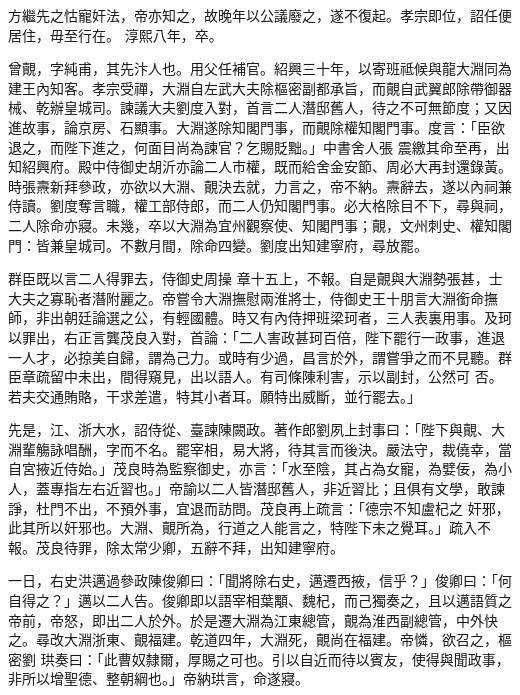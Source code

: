 \begin{pinyinscope}
 方繼先之怙寵奸法，帝亦知之，故晚年以公議廢之，遂不復起。孝宗即位，詔任便居住，毋至行在。
 淳熙八年，卒。



 曾覿，字純甫，其先汴人也。用父任補官。紹興三十年，以寄班祗候與龍大淵同為建王內知客。孝宗受禪，大淵自左武大夫除樞密副都承旨，而覿自武翼郎除帶御器械、乾辦皇城司。諫議大夫劉度入對，首言二人潛邸舊人，待之不可無節度；又因進故事，論京房、石顯事。大淵遂除知閣門事，而覿除權知閣門事。度言：「臣欲退之，而陛下進之，何面目尚為諫官？乞賜貶黜。」中書舍人張
 震繳其命至再，出知紹興府。殿中侍御史胡沂亦論二人市權，既而給舍金安節、周必大再封還錄黃。時張燾新拜參政，亦欲以大淵、覿決去就，力言之，帝不納。燾辭去，遂以內祠兼侍讀。劉度奪言職，權工部侍郎，而二人仍知閣門事。必大格除目不下，尋與祠，二人除命亦寢。未幾，卒以大淵為宜州觀察使、知閣門事；覿，文州刺史、權知閣門：皆兼皇城司。不數月間，除命四變。劉度出知建寧府，尋放罷。



 群臣既以言二人得罪去，侍御史周操
 章十五上，不報。自是覿與大淵勢張甚，士大夫之寡恥者潛附麗之。帝嘗令大淵撫慰兩淮將士，侍御史王十朋言大淵銜命撫師，非出朝廷論選之公，有輕國體。時又有內侍押班梁珂者，三人表裏用事。及珂以罪出，右正言龔茂良入對，首論：「二人害政甚珂百倍，陛下罷行一政事，進退一人才，必掠美自歸，謂為己力。或時有少過，昌言於外，謂嘗爭之而不見聽。群臣章疏留中未出，間得窺見，出以語人。有司條陳利害，示以副封，公然可
 否。若夫交通賄賂，干求差遣，特其小者耳。願特出威斷，並行罷去。」



 先是，江、浙大水，詔侍從、臺諫陳闕政。著作郎劉夙上封事曰：「陛下與覿、大淵輩觴詠唱酬，字而不名。罷宰相，易大將，待其言而後決。嚴法守，裁僥幸，當自宮掖近侍始。」茂良時為監察御史，亦言：「水至陰，其占為女寵，為嬖佞，為小人，蓋專指左右近習也。」帝諭以二人皆潛邸舊人，非近習比；且俱有文學，敢諫諍，杜門不出，不預外事，宜退而訪問。茂良再上疏言：「德宗不知盧杞之
 奸邪，此其所以奸邪也。大淵、覿所為，行道之人能言之，特陛下未之覺耳。」疏入不報。茂良待罪，除太常少卿，五辭不拜，出知建寧府。



 一日，右史洪邁過參政陳俊卿曰：「聞將除右史，邁遷西掖，信乎？」俊卿曰：「何自得之？」邁以二人告。俊卿即以語宰相葉顒、魏杞，而己獨奏之，且以邁語質之帝前，帝怒，即出二人於外。於是遷大淵為江東總管，覿為淮西副總管，中外快之。尋改大淵浙東、覿福建。乾道四年，大淵死，覿尚在福建。帝憐，欲召之，樞密劉
 珙奏曰：「此曹奴隸爾，厚賜之可也。引以自近而待以賓友，使得與聞政事，非所以增聖德、整朝綱也。」帝納珙言，命遂寢。




\end{pinyinscope}
